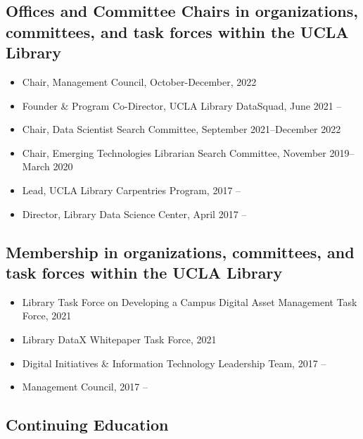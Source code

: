 
\subsection{Offices and Committee Chairs in organizations, committees, and task forces within the UCLA Library}

\begin{itemize}[label={},leftmargin=!,labelindent=5pt,itemindent=-15pt]
\item Chair, Management Council, October-December, 2022 
\item Founder \& Program Co-Director, UCLA Library DataSquad, June 2021 -- 
\item Chair, Data Scientist Search Committee, September 2021--December 2022
\item Chair, Emerging Technologies Librarian Search Committee, November 2019--March 2020
\item Lead, UCLA Library Carpentries Program, 2017 --
\item Director, Library Data Science Center, April 2017 --


\end{itemize}


\subsection{Membership in organizations, committees, and task forces within the UCLA Library}

\begin{itemize}[label={},leftmargin=!,labelindent=5pt,itemindent=-15pt]
\item Library Task Force on Developing a Campus Digital Asset Management Task Force, 2021
\item  Library DataX Whitepaper Task Force, 2021
\item Digital Initiatives \& Information Technology Leadership Team, 2017 --
\item Management Council, 2017 --

\end{itemize}

\subsection{Continuing Education}


